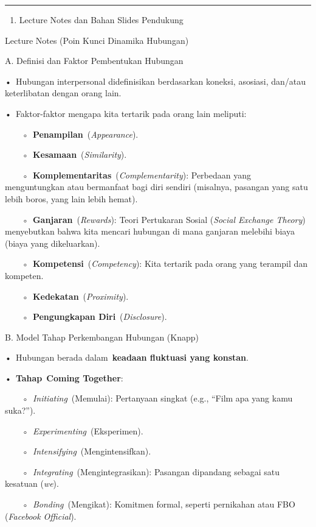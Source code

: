 \documentclass[
  letterpaper,
  DIV=11,
  numbers=noendperiod]{scrreprt}
\providecommand{\tightlist}{%
  \setlength{\itemsep}{0pt}\setlength{\parskip}{0pt}}
\begin{document}
\begin{center}\rule{0.5\linewidth}{0.5pt}\end{center}

\begin{enumerate}
\def\labelenumi{\arabic{enumi}.}
\setcounter{enumi}{2}
\tightlist
\item
  Lecture Notes dan Bahan Slides Pendukung
\end{enumerate}

Lecture Notes (Poin Kunci Dinamika Hubungan)

A. Definisi dan Faktor Pembentukan Hubungan

•~Hubungan interpersonal didefinisikan berdasarkan koneksi, asosiasi,
dan/atau keterlibatan dengan orang lain.

•~Faktor-faktor mengapa kita tertarik pada orang lain meliputi:

~~~~◦~\textbf{Penampilan}~(\emph{Appearance}).

~~~~◦~\textbf{Kesamaan}~(\emph{Similarity}).

~~~~◦~\textbf{Komplementaritas}~(\emph{Complementarity}): Perbedaan yang
menguntungkan atau bermanfaat bagi diri sendiri (misalnya, pasangan yang
satu lebih boros, yang lain lebih hemat).

~~~~◦~\textbf{Ganjaran}~(\emph{Rewards}): Teori Pertukaran Sosial
(\emph{Social Exchange Theory}) menyebutkan bahwa kita mencari hubungan
di mana ganjaran melebihi biaya (biaya yang dikeluarkan).

~~~~◦~\textbf{Kompetensi}~(\emph{Competency}): Kita tertarik pada orang
yang terampil dan kompeten.

~~~~◦~\textbf{Kedekatan}~(\emph{Proximity}).

~~~~◦~\textbf{Pengungkapan Diri}~(\emph{Disclosure}).

B. Model Tahap Perkembangan Hubungan (Knapp)

•~Hubungan berada dalam~\textbf{keadaan fluktuasi yang konstan}.

•~\textbf{Tahap}~\textbf{Coming Together}:

~~~~◦~\emph{Initiating}~(Memulai): Pertanyaan singkat (e.g., ``Film apa
yang kamu suka?'').

~~~~◦~\emph{Experimenting}~(Eksperimen).

~~~~◦~\emph{Intensifying}~(Mengintensifkan).

~~~~◦~\emph{Integrating}~(Mengintegrasikan): Pasangan dipandang sebagai
satu kesatuan (\emph{we}).

~~~~◦~\emph{Bonding}~(Mengikat): Komitmen formal, seperti pernikahan
atau FBO (\emph{Facebook Official}).
\end{document}
